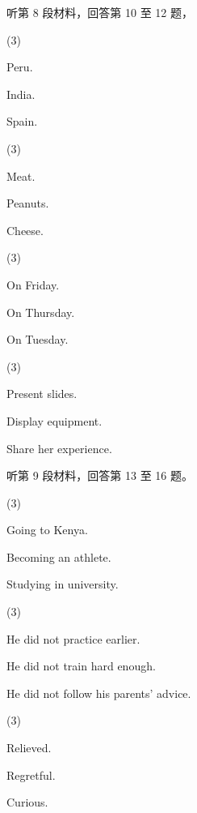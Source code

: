 \documentclass{英语试卷}
\begin{document}
\par 听第 8 段材料，回答第 10 至 12 题，\par
{}
\begin{choices}(3)
  \item Peru.
  \item India.
  \item Spain.
\end{choices}
\begin{choices}(3)
  \item Meat.
  \item Peanuts.
  \item Cheese.
\end{choices}
\begin{choices}(3)
  \item On Friday.
  \item On Thursday.
  \item On Tuesday.
\end{choices}
\begin{choices}(3)
  \item Present slides.
  \item Display equipment.
  \item Share her experience.
\end{choices}
\par 听第 9 段材料，回答第 13 至 16 题。\par
{}
\begin{choices}(3)
  \item Going to Kenya.
  \item Becoming an athlete.
  \item Studying in university.
\end{choices}
\begin{choices}(3)
  \item He did not practice earlier.
  \item He did not train hard enough.
  \item He did not follow his parents' advice.
\end{choices}
\begin{choices}(3)
  \item Relieved.
  \item Regretful.
  \item Curious.
\end{choices}
\end{document}

